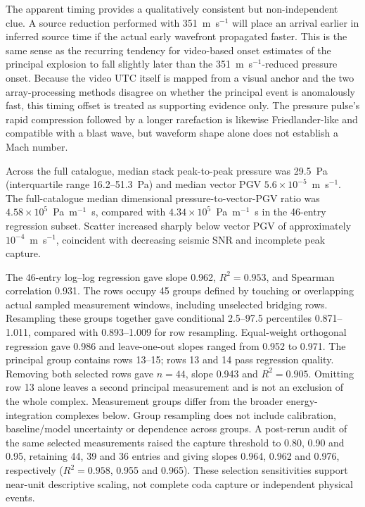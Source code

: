 \documentclass[]{seismica}
\begin{document}
The apparent timing provides a qualitatively consistent but non-independent
clue. A source reduction performed with 351~m~s$^{-1}$ will place an arrival
earlier in inferred source time if the actual early wavefront propagated
faster. This is the same sense as the recurring tendency for video-based onset
estimates of the principal explosion to fall slightly later than the
351~m~s$^{-1}$-reduced pressure onset. Because the video UTC itself is mapped
from a visual anchor and the two array-processing methods disagree on whether
the principal event is anomalously fast, this timing offset is treated as
supporting evidence only. The pressure pulse's rapid compression followed by
a longer rarefaction is likewise Friedlander-like and compatible with a blast
wave, but waveform shape alone does not establish a Mach number.

Across the full catalogue, median stack peak-to-peak pressure was 29.5~Pa
(interquartile range 16.2--51.3~Pa) and median vector PGV
$5.6\times10^{-5}$~m~s$^{-1}$. The full-catalogue median dimensional
pressure-to-vector-PGV ratio was
$4.58\times10^5$~Pa~m$^{-1}$~s, compared with
$4.34\times10^5$~Pa~m$^{-1}$~s in the 46-entry regression subset. Scatter
increased sharply below vector PGV of approximately $10^{-4}$~m~s$^{-1}$,
coincident with decreasing seismic SNR and incomplete peak capture.

The 46-entry log--log regression gave slope 0.962, $R^2=0.953$, and Spearman
correlation 0.931. The rows occupy 45 groups defined by touching or overlapping
actual sampled measurement windows, including unselected bridging rows.
Resampling these groups together gave conditional 2.5--97.5 percentiles
0.871--1.011, compared with 0.893--1.009 for row resampling. Equal-weight
orthogonal regression gave 0.986 and leave-one-out slopes ranged from 0.952
to 0.971. The principal group contains rows 13--15; rows 13 and 14 pass
regression quality. Removing both selected rows gave $n=44$, slope 0.943 and
$R^2=0.905$. Omitting row 13 alone leaves a second principal measurement and
is not an exclusion of the whole complex. Measurement groups differ from the
broader energy-integration complexes below. Group resampling does not include
calibration, baseline/model uncertainty or dependence across groups.
A post-rerun audit of the same selected measurements raised the capture
threshold to 0.80, 0.90 and 0.95, retaining 44, 39 and 36 entries and giving
slopes 0.964, 0.962 and 0.976, respectively ($R^2=0.958$, 0.955 and 0.965).
These selection sensitivities support near-unit descriptive scaling, not
complete coda capture or independent physical events.
\end{document}
